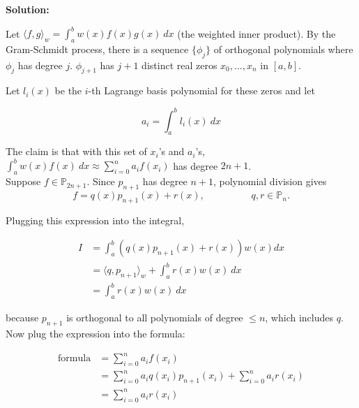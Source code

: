 \documentclass[a4paper,11pt]{report}
\begin{document}
\begin{enumerate}
\begin{itemize}
   \textbf{Solution:} 

    Let $\langle f, g \rangle_{w} = \displaystyle \int_{a}^{b} w(x) f(x) g(x)\ dx$ (the weighted inner product). By the Gram-Schmidt process, there is a sequence
    $\{\phi_{j}\}$ of orthogonal polynomials where $\phi_{j}$ has degree $j$. $\phi_{j+1}$ has $j+1$ distinct real zeros $x_{0}, ..., x_{n}$ in $[a, b]$. 

    Let $l_{i} (x)$ be the $i$-th Lagrange basis polynomial for these zeros and let
    
    \begin{equation*}
    a_{i} = \int_{a}^{b} l_{i} (x)\ dx
    \end{equation*}    

    The claim is that with this set of $x_{i}$'s and $a_{i}$'s, $\displaystyle \int_{a}^{b} w(x) f(x)\ dx \approx \sum_{i=0}^{n} a_{i} f(x_{i})$ has degree $2n+1$. \\

    Suppose $f \in \mathbb{P}_{2n+1}$. Since $p_{n+1}$ has degree $n+1$, polynomial division gives
    \begin{equation*}
    f = q(x)p_{n+1} (x) + r(x), \hspace{2cm} q, r \in \mathbb{P}_{n}.
    \end{equation*}

    Plugging this expression into the integral,

    \begin{equation*}
    \begin{aligned}
    I &= \int_{a}^{b} (q(x)p_{n+1}(x) + r(x)) w(x) dx \\
      &= \langle q, p_{n+1} \rangle_{w} + \int_{a}^{b} r(x) w(x)\ dx \\
      &= \int_{a}^{b} r(x) w(x)\ dx
    \end{aligned}
    \end{equation*}

    because $p_{n+1}$ is orthogonal to all polynomials of degree $\le n$, which includes $q$. Now plug the expression into the formula:

    \begin{equation*}
    \begin{aligned}
    \text{formula} &= \sum_{i=0}^{n} a_{i} f(x_{i}) \\
    &= \sum_{i=0}^{n} a_{i} q(x_{i}) p_{n+1}(x_{i}) + \sum_{i=0}^{n} a_{i} r(x_{i}) \\
    &= \sum_{i=0}^{n} a_{i} r(x_{i})
    \end{aligned}
    \end{equation*}
 

\end{itemize}
\end{enumerate}
\end{document}
